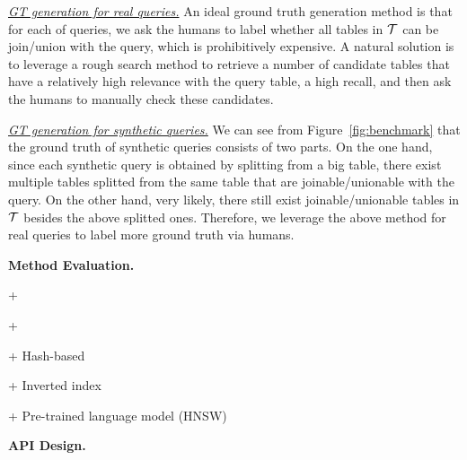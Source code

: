  \noindent \underline{\textit{GT generation for real queries.}} An ideal ground truth generation method is that for each of queries, we ask the humans to label whether all tables in $\mathcal{T}$ can be join/union with the query, which is prohibitively expensive. A natural solution is to leverage a rough search  method to retrieve a number of candidate tables that have a relatively high relevance with the query table, \ie a high recall, and then ask the humans to manually check these candidates.
 
 \noindent \underline{\textit{GT generation for synthetic queries.}} We can see from  Figure~\ref{fig:benchmark} that the ground truth of synthetic queries consists of two parts. 
 On the one hand, since each synthetic query is obtained by splitting from a big table, there exist multiple tables splitted from the same table that are joinable/unionable with the query. 
  On the other hand, very likely, there  still exist joinable/unionable tables in $\mathcal{T}$ besides the above  splitted ones.  Therefore, we leverage the above method for  real queries to label more ground truth via humans.

\noindent\textbf{Method Evaluation.} 


+ 

+ 

+ Hash-based

+ Inverted index 

+ Pre-trained language model (HNSW)


\noindent\textbf{API Design.}

